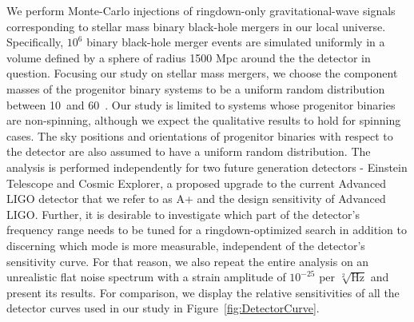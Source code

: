 We perform Monte-Carlo injections of ringdown-only gravitational-wave signals corresponding to stellar mass binary black-hole mergers in our local universe. Specifically, $10^{6}$ binary black-hole merger events are simulated uniformly in a volume defined by a sphere of radius 1500 Mpc around the the detector in question. Focusing our study on stellar mass mergers, we choose the component masses of the progenitor binary systems to be a uniform random distribution between 10~\Msun and 60~\Msun. Our study is limited to systems whose progenitor binaries are non-spinning, although we expect the qualitative results to hold for spinning cases. The sky positions and orientations of progenitor binaries with respect to the detector are also assumed to have a uniform random distribution. The analysis is performed independently for two future generation detectors - Einstein Telescope and Cosmic Explorer, a proposed upgrade to the current Advanced LIGO detector that we refer to as A+ and the design sensitivity of Advanced LIGO. 
Further, it is desirable to investigate which part of the detector's frequency range needs to be tuned for a ringdown-optimized search in addition to discerning which mode is more measurable, independent of the detector's sensitivity curve. For that reason, we also repeat the entire analysis on an unrealistic flat noise spectrum with a strain amplitude of $10^{-25}$ per $\sqrt[2]{\mathrm{Hz}}$ and present its results. For comparison, we display the relative sensitivities of all the detector curves used in our study in Figure~\ref{fig:DetectorCurve}.

